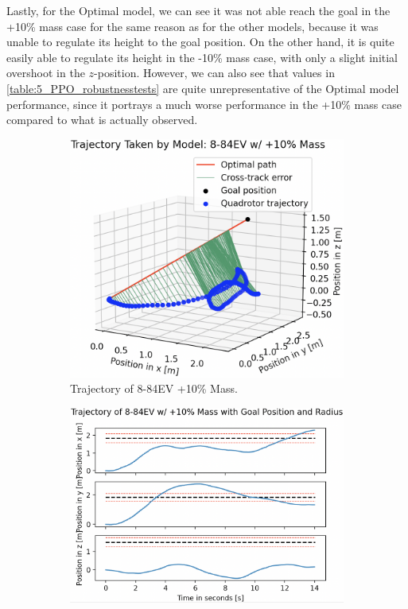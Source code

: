 Lastly, for the Optimal model, we can see it was not able reach the goal in the +10\% mass case for the same reason as for the other models, because it was unable to regulate its height to the goal position. On the other hand, it is quite easily able to regulate its height in the -10\% mass case, with only a slight initial overshoot in the $z$-position. However, we can also see that values in \cref{table:5_PPO_robustnesstests} are quite unrepresentative of the Optimal model performance, since it portrays a much worse performance in the +10\% mass case compared to what is actually observed.
\begin{figure}[H]
     \centering
     \begin{subfigure}[b]{0.48\textwidth}
         \centering
         \captionsetup{justification=centering}
         \includegraphics[width=\textwidth]{figures/5_/Testing/ppo_test_robust+10-884EV1.png}
         \caption{Trajectory of 8-84EV +10\% Mass.}
         \label{fig:testing_robust+10_ppo884EV1}
     \end{subfigure} 
     \hfill 
    \begin{subfigure}[b]{0.49\textwidth}
         \centering
         \captionsetup{justification=centering}
         \includegraphics[width=\textwidth]{figures/5_/Testing/ppo_test_robust+10-884EV2.png}

\end{subfigure}
\end{figure}
